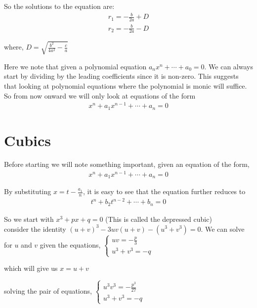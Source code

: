 So the solutions to the equation are:
\begin{align*}
r_1=-\frac{b}{2a}+D\\
r_2=-\frac{b}{2a}-D
\end{align*}

where, $D=\sqrt{\frac{b^2}{4a^2}-\frac{c}{a}}$

Here we note that given a polynomial equation $a_nx^n+\cdots+a_0=0$. We can always start by dividing by the leading coefficients since it is non-zero. This suggests that looking at polynomial equations where the polynomial is monic will suffice. So from now onward we will only look at equations of the form 
\begin{align*}
x^n+a_1x^{n-1}+\cdots+a_n=0
\end{align*}

\eject

\section{Cubics}

Before starting we will note something important, given an equation of the form,
\begin{align*}
x^n+a_1x^{n-1}+\cdots+a_n=0
\end{align*}

By substituting $x=t-\frac{a_1}{n}$, it is easy to see that the equation further reduces to 
\begin{align*}
t^n+b_2t^{n-2}+\cdots+b_n=0
\end{align*}

So we start with $x^3+px+q=0$ (This is called the depressed cubic)\\
consider the identity $(u+v)^3-3uv(u+v)-(u^3+v^3)=0$. We can solve for $u$ and $v$ given the equations,
$\begin{cases}
uv=-\frac{p}{3}\\
u^3+v^3=-q
\end{cases}$

which will give us $x=u+v$

solving the pair of equations,
$\begin{cases}
u^3v^3=-\frac{p^3}{27}\\
u^3+v^3=-q
\end{cases}$

